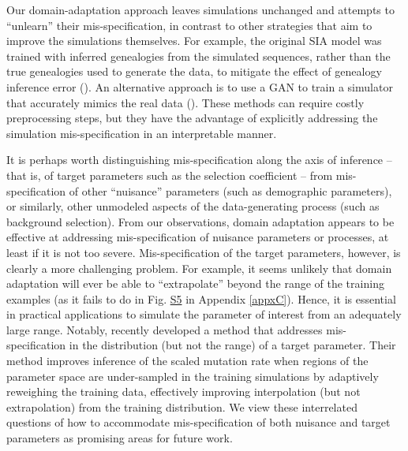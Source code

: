 Our domain-adaptation approach leaves simulations unchanged and attempts to “unlearn” their mis-specification, in contrast to other strategies that aim to improve the simulations themselves. For example, the original \ac{SIA} model was trained with inferred genealogies from the simulated sequences, rather than the true genealogies used to generate the data, to mitigate the effect of genealogy inference error (\cite{hejase_deep-learning_2022}). An alternative approach is to use a \ac{GAN} to train a simulator that accurately mimics the real data (\cite{wang_automatic_2021}). These methods can require costly preprocessing steps, but they have the advantage of explicitly addressing the simulation mis-specification in an interpretable manner.

It is perhaps worth distinguishing mis-specification along the axis of inference -- that is, of target parameters such as the selection coefficient -- from mis-specification of other “nuisance” parameters (such as demographic parameters), or similarly, other unmodeled aspects of the data-generating process (such as background selection). From our observations, domain adaptation appears to be effective at addressing mis-specification of nuisance parameters or processes, at least if it is not too severe. Mis-specification of the target parameters, however, is clearly a more challenging problem. For example, it seems unlikely that domain adaptation will ever be able to “extrapolate” beyond the range of the training examples (as it fails to do in Fig. \href{https://journals.plos.org/plosgenetics/article?id=10.1371/journal.pgen.1011032#sec018}{S5} in Appendix \ref{appxC}). Hence, it is essential in practical applications to simulate the parameter of interest from an adequately large range. Notably, \cite{burger_neural_2022} recently developed a method that addresses mis-specification in the distribution (but not the range) of a target parameter. Their method improves inference of the scaled mutation rate when regions of the parameter space are under-sampled in the training simulations by adaptively reweighing the training data, effectively improving interpolation (but not extrapolation) from the training distribution. We view these interrelated questions of how to accommodate mis-specification of both nuisance and target parameters as promising areas for future work.


